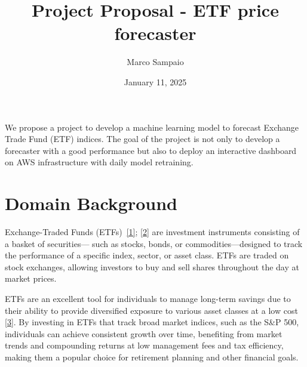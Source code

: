 \documentclass[10pt]{article}
\renewenvironment{abstract}
  {{\bfseries\noindent{\abstractname}\par\nobreak}\footnotesize}
  {\bigskip}
\begin{document}
\title{Project Proposal - ETF price forecaster}



\author[1]{Marco Sampaio}%
%


\vspace{-1em}




  \date{January 11, 2025}


\begingroup
\let\center\flushleft
\let\endcenter\endflushleft
\maketitle
\endgroup





\begin{abstract}
We propose a project to develop a machine learning model to forecast
Exchange Trade Fund (ETF) indices. The goal of the project is not only
to develop a forecaster with a good performance but also to deploy an
interactive dashboard on AWS infrastructure with daily model
retraining.~%
\end{abstract}%



\sloppy


\hypertarget{domain-background}{%
\section*{Domain Background}}

{\label{113420}}

Exchange-Traded Funds (ETFs)~\hyperref[csl:1]{[1]}; \hyperref[csl:2]{[2]} are investment
instruments consisting of a basket of securities--- such as stocks,
bonds, or commodities---designed to track the performance of a specific
index, sector, or asset class. ETFs are traded on stock exchanges,
allowing investors to buy and sell shares throughout the day at market
prices.~

ETFs are an excellent tool for individuals to manage long-term savings
due to their ability to provide diversified exposure to various asset
classes at a low cost \hyperref[csl:3]{[3]}. By investing in ETFs that
track broad market indices, such as the S\&P 500, individuals can
achieve consistent growth over time, benefiting from market trends and
compounding returns at low management fees and tax efficiency, making
them a popular choice for retirement planning and other financial goals.
\end{document}
